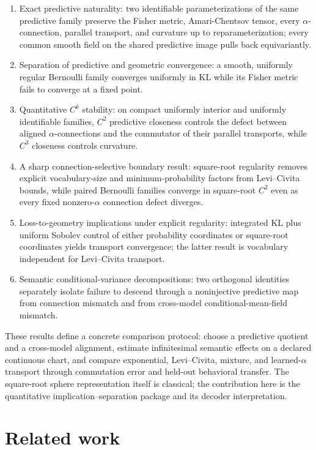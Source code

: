 \documentclass[11pt]{article}
\theoremstyle{definition}
\theoremstyle{remark}
\begin{document}
\begin{enumerate}[leftmargin=*,itemsep=0.35em]
    \item Exact predictive naturality: two identifiable parameterizations of the same predictive family preserve the Fisher metric, Amari-Chentsov tensor, every $\alpha$-connection, parallel transport, and curvature up to reparameterization; every common smooth field on the shared predictive image pulls back equivariantly.
    \item Separation of predictive and geometric convergence: a smooth, uniformly regular Bernoulli family converges uniformly in KL while its Fisher metric fails to converge at a fixed point.
    \item Quantitative $C^k$ stability: on compact uniformly interior and uniformly identifiable families, $C^2$ predictive closeness controls the defect between aligned $\alpha$-connections and the commutator of their parallel transports, while $C^3$ closeness controls curvature.
    \item A sharp connection-selective boundary result: square-root regularity removes explicit vocabulary-size and minimum-probability factors from Levi--Civita bounds, while paired Bernoulli families converge in square-root $C^2$ even as every fixed nonzero-$\alpha$ connection defect diverges.
    \item Loss-to-geometry implications under explicit regularity: integrated KL plus uniform Sobolev control of either probability coordinates or square-root coordinates yields transport convergence; the latter result is vocabulary independent for Levi--Civita transport.
    \item Semantic conditional-variance decompositions: two orthogonal identities separately isolate failure to descend through a noninjective predictive map from connection mismatch and from cross-model conditional-mean-field mismatch.
\end{enumerate}

These results define a concrete comparison protocol: choose a predictive quotient and a cross-model alignment, estimate infinitesimal semantic effects on a declared continuous chart, and compare exponential, Levi--Civita, mixture, and learned-$\alpha$ transport through commutation error and held-out behavioral transfer. The square-root sphere representation itself is classical; the contribution here is the quantitative implication--separation package and its decoder interpretation.

\section{Related work}
\end{document}
